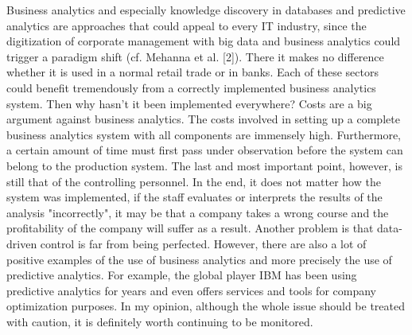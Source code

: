 \documentclass[12pt,twocolumn,twoside]{conference}   %
\begin{document}
Business analytics and especially knowledge discovery in databases and predictive analytics are approaches that could appeal to every IT industry, since the digitization of corporate management with big data and business analytics could trigger a paradigm shift (cf. Mehanna et al. [2]). There it makes no difference whether it is used in a normal retail trade or in banks. Each of these sectors could benefit tremendously from a correctly implemented business analytics system. Then why hasn't it been implemented everywhere? Costs are a big argument against business analytics. The costs involved in setting up a complete business analytics system with all components are immensely high. Furthermore, a certain amount of time must first pass under observation before the system can belong to the production system. The last and most important point, however, is still that of the controlling personnel. In the end, it does not matter how the system was implemented, if the staff evaluates or interprets the results of the analysis "incorrectly", it may be that a company takes a wrong course and the profitability of the company will suffer as a result. Another problem is that data-driven control is far from being perfected. However, there are also a lot of positive examples of the use of business analytics and more precisely the use of predictive analytics. For example, the global player IBM has been using predictive analytics for years and even offers services and tools for company optimization purposes. In my opinion, although the whole issue should be treated with caution, it is definitely worth continuing to be monitored.  
\newpage
\end{document}
